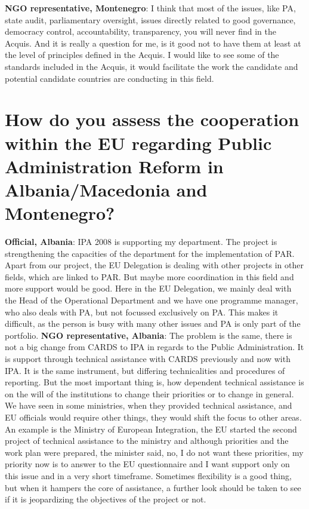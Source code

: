 \textbf{NGO representative, Montenegro}: I think that most of the issues, like PA, state audit, parliamentary oversight, issues directly related to good governance, democracy control, accountability, transparency, you will never find in the Acquis. And it is really a question for me, is it good not to have them at least at the level of principles defined in the Acquis. I would like to see some of the standards included in the Acquis, it would facilitate the work the candidate and potential candidate countries are conducting in this field.%
\section{How do you assess the cooperation within the EU regarding Public Administration Reform in Albania/Macedonia and Montenegro?}
\textbf{Official, Albania}: IPA 2008 is supporting my department. The project is strengthening the capacities of the department for the implementation of PAR. Apart from our project, the EU Delegation is dealing with other projects in other fields, which are linked to PAR. But maybe more coordination in this field and more support would be good. Here in the EU Delegation, we mainly deal with the Head of the Operational Department and we have one programme manager, who also deals with PA, but not focussed exclusively on PA. This makes it difficult, as the person is busy with many other issues and PA is only part of the portfolio.
\textbf{NGO representative, Albania}: The problem is the same, there is not a big change from CARDS to IPA in regards to the Public Administration. It is support through technical assistance with CARDS previously and now with IPA. It is the same instrument, but differing technicalities and procedures of reporting. But the most important thing is, how dependent technical assistance is on the will of the institutions to change their priorities or to change in general. We have seen in some ministries, when they provided technical assistance, and EU officials would require other things, they would shift the focus to other areas. An example is the Ministry of European Integration, the EU started the second project of technical assistance to the ministry and although priorities and the work plan were prepared, the minister said, no, I do not want these priorities, my priority now is to answer to the EU questionnaire and I want support only on this issue and in a very short timeframe. Sometimes flexibility is a good thing, but when it hampers the core of assistance, a further look should be taken to see if it is jeopardizing the objectives of the project or not. 
